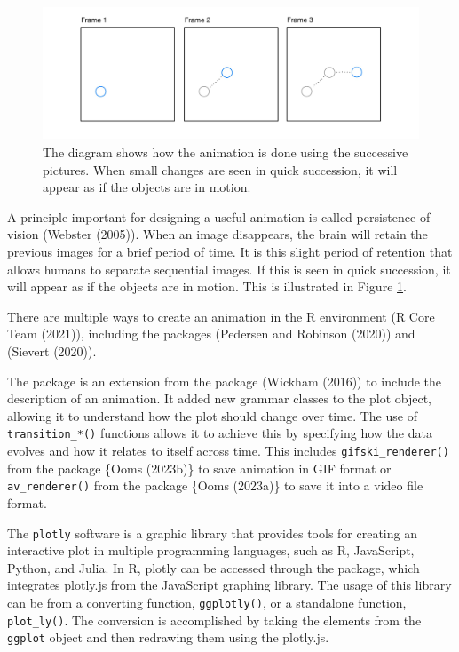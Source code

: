 \begin{figure}

{\centering \includegraphics[width=1\linewidth]{figures/animation-diagram} 

}

\caption{The diagram shows how the animation is done using the successive pictures. When small changes are seen in quick succession, it will appear as if the objects are in motion.}\label{fig:animation-diagram}
\end{figure}

A principle important for designing a useful animation is called persistence of vision (Webster (2005)). When an image disappears, the brain will retain the previous images for a brief period of time. It is this slight period of retention that allows humans to separate sequential images. If this is seen in quick succession, it will appear as if the objects are in motion. This is illustrated in Figure \ref{fig:animation-diagram}.

There are multiple ways to create an animation in the R environment (R Core Team (2021)), including the packages  (Pedersen and Robinson (2020)) and  (Sievert (2020)).

The  package is an extension from the  package (Wickham (2016)) to include the description of an animation. It added new grammar classes to the plot object, allowing it to understand how the plot should change over time. The use of \texttt{transition\_*()} functions allows it to achieve this by specifying how the data evolves and how it relates to itself across time. This includes \texttt{gifski\_renderer()} from the  package \{Ooms (2023b)\} to save animation in GIF format or \texttt{av\_renderer()} from the  package \{Ooms (2023a)\} to save it into a video file format.

The \texttt{plotly} software is a graphic library that provides tools for creating an interactive plot in multiple programming languages, such as R, JavaScript, Python, and Julia. In R, plotly can be accessed through the  package, which integrates plotly.js from the JavaScript graphing library. The usage of this library can be from a converting function, \texttt{ggplotly()}, or a standalone function, \texttt{plot\_ly()}. The conversion is accomplished by taking the elements from the \texttt{ggplot} object and then redrawing them using the plotly.js.

